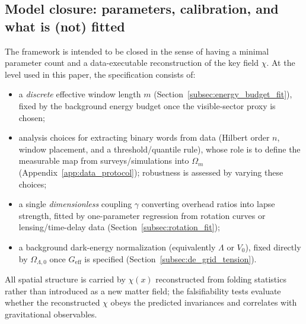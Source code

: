 \subsection{Model closure: parameters, calibration, and what is (not) fitted}
\label{subsec:model_closure}
The framework is intended to be closed in the sense of having a minimal parameter count and a data-executable reconstruction of the key field $\chi$.
At the level used in this paper, the specification consists of:
\begin{itemize}
\item a \emph{discrete} effective window length $m$ (Section~\ref{subsec:energy_budget_fit}), fixed by the background energy budget once the visible-sector proxy is chosen;
\item analysis choices for extracting binary words from data (Hilbert order $n$, window placement, and a threshold/quantile rule), whose role is to define the measurable map from surveys/simulations into $\Omega_m$ (Appendix~\ref{app:data_protocol}); robustness is assessed by varying these choices;
\item a single \emph{dimensionless} coupling $\gamma$ converting overhead ratios into lapse strength, fitted by one-parameter regression from rotation curves or lensing/time-delay data (Section~\ref{subsec:rotation_fit});
\item a background dark-energy normalization (equivalently $\Lambda$ or $V_0$), fixed directly by $\Omega_{\Lambda,0}$ once $G_{\mathrm{eff}}$ is specified (Section~\ref{subsec:de_grid_tension}).
\end{itemize}
All spatial structure is carried by $\chi(x)$ reconstructed from folding statistics rather than introduced as a new matter field; the falsifiability tests evaluate whether the reconstructed $\chi$ obeys the predicted invariances and correlates with gravitational observables.



